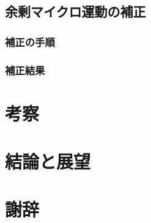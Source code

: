 \documentclass[a4j,10.5pt,titlepage]{jarticle}
\begin{document}
	\subsection{余剰マイクロ運動の補正}
		\subsubsection{補正の手順}
		\subsubsection{補正結果}
		
\section{考察}
\section{結論と展望}
\section*{謝辞}
\begin{thebibliography}{99}
\end{thebibliography}


%
%
%
%
%
%
%
\end{document}
